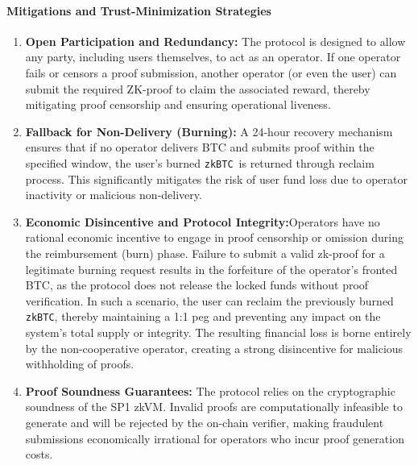 \documentclass{DESSThesis}
\newcommand{\zktoken}{\texttt{zkBTC}}
\begin{document}
\paragraph{Mitigations and Trust-Minimization Strategies}
    \begin{enumerate}
        \item \textbf{Open Participation and Redundancy:} The protocol is designed to allow any party, including users themselves, to act as an operator. If one operator fails or censors a proof submission, another operator (or even the user) can submit the required ZK-proof to claim the associated reward, thereby mitigating proof censorship and ensuring operational liveness.
        \item \textbf{Fallback for Non-Delivery (Burning):} A 24-hour recovery mechanism ensures that if no operator delivers BTC and submits proof within the specified window, the user's burned \zktoken\ is returned through reclaim process. This significantly mitigates the risk of user fund loss due to operator inactivity or malicious non-delivery.
        \item \textbf{Economic Disincentive and Protocol Integrity:}Operators have no rational economic incentive to engage in proof censorship or omission during the reimbursement (burn) phase. Failure to submit a valid zk-proof for a legitimate burning request results in the forfeiture of the operator's fronted BTC, as the protocol does not release the locked funds without proof verification. In such a scenario, the user can reclaim the previously burned \zktoken, thereby maintaining a 1:1 peg and preventing any impact on the system's total supply or integrity. The resulting financial loss is borne entirely by the non-cooperative operator, creating a strong disincentive for malicious withholding of proofs.
        \item \textbf{Proof Soundness Guarantees:} The protocol relies on the cryptographic soundness of the SP1 zkVM. Invalid proofs are computationally infeasible to generate and will be rejected by the on-chain verifier, making fraudulent submissions economically irrational for operators who incur proof generation costs.
    \end{enumerate}
\end{document}
